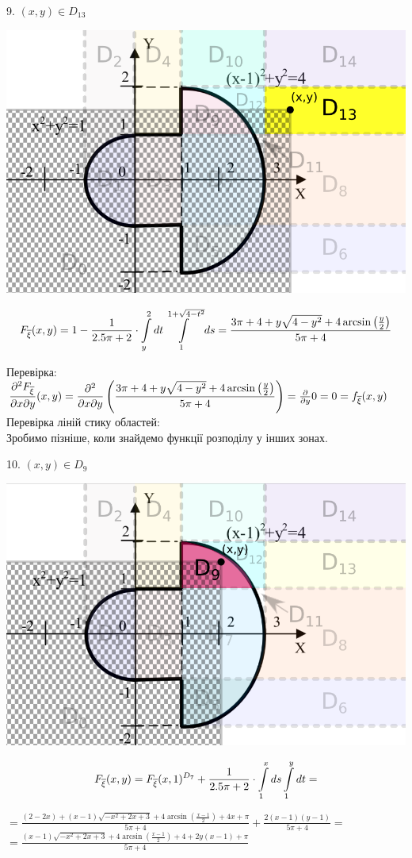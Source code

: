 \documentclass[14pt,a4paper]{scrartcl}
\theoremstyle{definition}
\theoremstyle{remark}
\theoremstyle{definition}
\theoremstyle{definition}
\begin{document}
9. $(x,y) \in D_{13}$
\begin{center} \includegraphics[scale=0.4]{assets/zone131245.png} \end{center}
$$
F_{\overline{\xi}} (x,y) =1 -  \frac{1}{2.5\pi + 2} \cdot  \int\limits_{y}^{ 2}{dt  \int\limits_{1}^{1 + \sqrt{4 - t^2}}{ds}}  =\dfrac{3\pi + 4 + y\sqrt{4-y^2}+4\arcsin\left(\frac{y}{2} \right)}{5\pi + 4}
$$

Перевірка:\\
$\dfrac{\partial^2 F_{\overline{\xi}}}{\partial x \partial y}(x,y) =
\dfrac{\partial^2}{\partial x \partial y} \left( \dfrac{3\pi + 4 + y\sqrt{4-y^2}+4\arcsin\left(\frac{y}{2} \right)}{5\pi + 4} \right)  = \frac{\partial}{\partial y}0 = 0=f_{\overline{\xi}} (x,y)$\\

Перевірка ліній стику областей:\\
Зробимо пізніше, коли знайдемо функції розподілу у інших зонах.
\newpage

10. $(x,y) \in D_9$
\begin{center} \includegraphics[scale=0.4]{assets/zone1091.png} \end{center}
$$
F_{\overline{\xi}} (x,y) =  F_{\overline{\xi}} (x, 1)^{D_7} + \frac{1}{2.5\pi + 2} \cdot  \int\limits_{1}^{ x}{ds  \int\limits_{1}^{ y}{dt}} =
$$
\begin{center}
$
=\frac{\left(2-2x\right)+\left(x-1\right)\sqrt{-x^2+2x+3}+4\arcsin\left(\frac{x-1}{2}\right)+ 4x +\pi}{5\pi + 4} + \frac{2(x-1)(y-1)}{5\pi + 4} =
$\\
$
=\frac{\left(x-1\right)\sqrt{-x^2+2x+3}+4\arcsin\left(\frac{x-1}{2}\right)+4 +2y(x-1) +\pi}{5\pi + 4}
$
\end{center}
\end{document}
